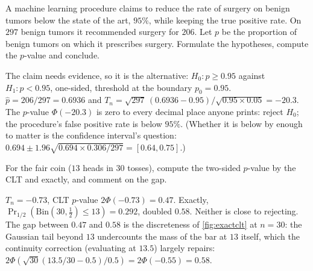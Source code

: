 \begin{exercise}
\label{ex:tests-cancer}
A machine learning procedure claims to reduce the rate of surgery on benign tumors below the state of the art, $95\%$, while keeping the true positive rate. On $297$ benign tumors it recommended surgery for $206$. Let $p$ be the proportion of benign tumors on which it prescribes surgery. Formulate the hypotheses, compute the $p$-value and conclude.
\end{exercise}
\begin{solution}
The claim needs evidence, so it is the alternative: $H_0: p \geq 0.95$ against $H_1: p < 0.95$, one-sided, threshold at the boundary $p_0 = 0.95$. $\hat{p} = 206/297 = 0.6936$ and $T_n = \sqrt{297}\,(0.6936 - 0.95)/\sqrt{0.95 \times 0.05} = -20.3$. The $p$-value $\Phi(-20.3)$ is zero to every decimal place anyone prints: reject $H_0$; the procedure's false positive rate is below $95\%$. (Whether it is below by enough to matter is the confidence interval's question: $0.694 \pm 1.96\sqrt{0.694 \times 0.306/297} = [0.64, 0.75]$.)
\end{solution}

\begin{exercise}
\label{ex:tests-coin}
For the fair coin ($13$ heads in $30$ tosses), compute the two-sided $p$-value by the CLT and exactly, and comment on the gap.
\end{exercise}
\begin{solution}
$T_n = -0.73$, CLT $p$-value $2\Phi(-0.73) = 0.47$. Exactly, $\Pr_{1/2}(\mathrm{Bin}(30, \frac12) \leq 13) = 0.292$, doubled $0.58$. Neither is close to rejecting. The gap between $0.47$ and $0.58$ is the discreteness of \cref{fig:exactclt} at $n = 30$: the Gaussian tail beyond $13$ undercounts the mass of the bar at $13$ itself, which the continuity correction (evaluating at $13.5$) largely repairs: $2\Phi(\sqrt{30}(13.5/30 - 0.5)/0.5) = 2\Phi(-0.55) = 0.58$.
\end{solution}

